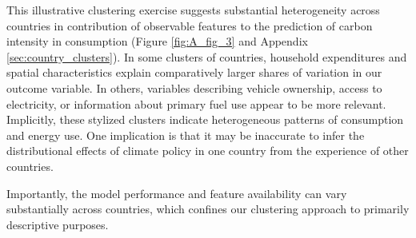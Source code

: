 \documentclass[12pt, a4paper]{article}
\begin{document}

This illustrative clustering exercise suggests substantial heterogeneity across countries in contribution of observable features to the prediction of carbon intensity in consumption (Figure \ref{fig:A_fig_3} and Appendix \ref{sec:country_clusters}). In some clusters of countries, household expenditures and spatial characteristics explain comparatively larger shares of variation in our outcome variable. In others, variables describing vehicle ownership, access to electricity, or information about primary fuel use appear to be more relevant. Implicitly, these stylized clusters indicate heterogeneous patterns of consumption and energy use. One implication is that it may be inaccurate to infer the distributional effects of climate policy in one country from the experience of other countries.

Importantly, the model performance and feature availability can vary substantially across countries, which confines our clustering approach to primarily descriptive purposes.

\end{document}
